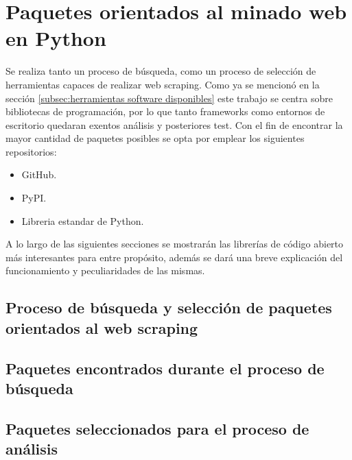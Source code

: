 \chapter{Paquetes orientados al minado web en Python}
\label{cha:paquetes oprientados al minado web en python}

Se realiza tanto un proceso de búsqueda, como un proceso de selección de herramientas capaces de realizar 
web scraping. Como ya se mencionó en la sección \ref{subsec:herramientas software disponibles} este trabajo 
se centra sobre bibliotecas de programación, por lo que tanto frameworks como entornos de escritorio 
quedaran exentos análisis y posteriores test. Con el fin de encontrar la mayor cantidad de paquetes 
posibles se opta por emplear los siguientes repositorios:

\begin{itemize}
  \item GitHub.
  \item PyPI.
  \item Libreria estandar de Python.
\end{itemize}

A lo largo de las siguientes secciones se mostrarán las librerías de código abierto más interesantes para
entre propósito, además se dará una breve explicación del funcionamiento y peculiaridades de las mismas.

\section{Proceso de búsqueda y selección de paquetes orientados al web scraping}
\label{sec:proceso de busqueda y seleccion de paquetes orientados al web scraping}


\section{Paquetes encontrados durante el proceso de búsqueda}
\label{sec:paquetes encontrados durante el proceso de busqueda}

\section{Paquetes seleccionados para el proceso de análisis}
\label{sec:paquetes seleccionados para el proceso de analisis}



















